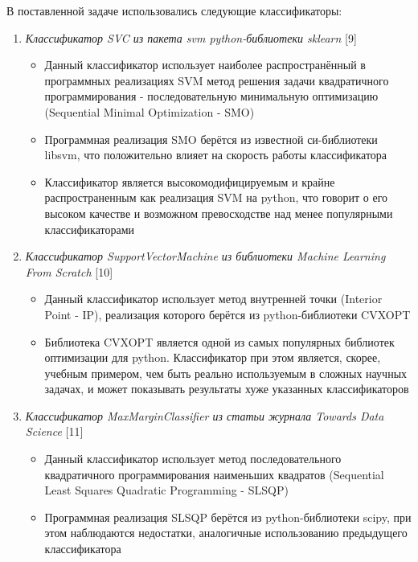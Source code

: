 \documentclass[main.tex]{subfiles}
\begin{document}
В поставленной задаче использовались следующие классификаторы:
\begin{enumerate}
    \item \textit{Классификатор SVC из пакета svm python-библиотеки sklearn} [9]
        \begin{itemize}
            \item Данный классификатор использует наиболее распространённый в программных реализациях SVM метод решения задачи квадратичного программирования - последовательную минимальную оптимизацию (Sequential Minimal Optimization - SMO)
            \item Программная реализация SMO берётся из известной си-библиотеки libsvm, что положительно влияет на скорость работы классификатора
            \item Классификатор является высокомодифицируемым и крайне распространенным как реализация SVM на python, что говорит о его высоком качестве и возможном превосходстве над менее популярными классификаторами
        \end{itemize}
    \item \textit{Классификатор SupportVectorMachine из библиотеки Machine Learning From Scratch} [10]
        \begin{itemize}
            \item Данный классификатор использует метод внутренней точки (Interior Point - IP), реализация которого берётся из python-библиотеки CVXOPT
            \item Библиотека CVXOPT является одной из самых популярных библиотек оптимизации для python. Классификатор при этом является, скорее, учебным примером, чем быть реально используемым в сложных научных задачах, и может показывать результаты хуже указанных классификаторов
        \end{itemize}
    \item \textit{Классификатор MaxMarginClassifier из статьи журнала Towards Data Science} [11]
        \begin{itemize}
            \item Данный классификатор использует метод последовательного квадратичного программирования наименьших квадратов (Sequential Least Squares Quadratic Programming - SLSQP)
            \item Программная реализация SLSQP берётся из python-библиотеки scipy, при этом наблюдаются недостатки, аналогичные использованию предыдущего классификатора
        \end{itemize}
\end{enumerate}
\end{document}
